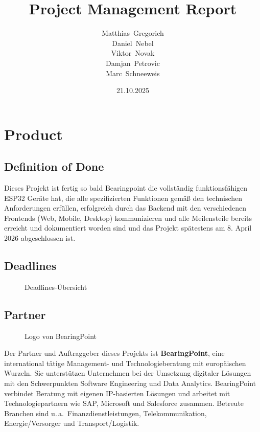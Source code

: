\documentclass{article}
\title{Project Management Report}
\author{Matthias~Gregorich\\Daniel~Nebel\\Viktor~Novak\\Damjan~Petrovic\\Marc~Schneeweis}
\date{21.10.2025}
\begin{document}
\maketitle
\thispagestyle{empty}

\clearpage

\setcounter{tocdepth}{2}
\setcounter{secnumdepth}{2}

\tableofcontents
\clearpage

\setcounter{page}{1}




\section{Product}
\subsection{Definition of Done}
Dieses Projekt ist fertig so bald Bearingpoint die vollständig funktionsfähigen ESP32 Geräte hat, die alle spezifizierten Funktionen gemäß den technischen Anforderungen erfüllen, erfolgreich durch das Backend mit den verschiedenen Frontends (Web, Mobile, Desktop) kommunizieren und alle Meilensteile bereits erreicht und dokumentiert worden sind und das Projekt spätestens am 8. April 2026 abgeschlossen ist.

\subsection{Deadlines}
\begin{figure}[H]
  \centering
  
  \caption{Deadlines-Übersicht}
  \label{fig:deadlines}
\end{figure}



\subsection{Partner}

\begin{figure}[h]
  \centering
   
  \caption{Logo von BearingPoint}
  \label{fig:bearingpoint-logo}
\end{figure}


\noindent
Der Partner und Auftraggeber dieses Projekts ist \textbf{BearingPoint}, eine international tätige Management- und Technologieberatung mit europäischen Wurzeln. 
Sie unterstützen Unternehmen bei der Umsetzung digitaler Lösungen mit den Schwerpunkten Software Engineering und Data Analytics.
BearingPoint verbindet Beratung mit eigenen IP-basierten Lösungen und arbeitet mit Technologiepartnern wie SAP, Microsoft und Salesforce zusammen. 
Betreute Branchen sind u.\,a.\ Finanzdienstleistungen, Telekommunikation, Energie/Versorger und Transport/Logistik.
\end{document}
